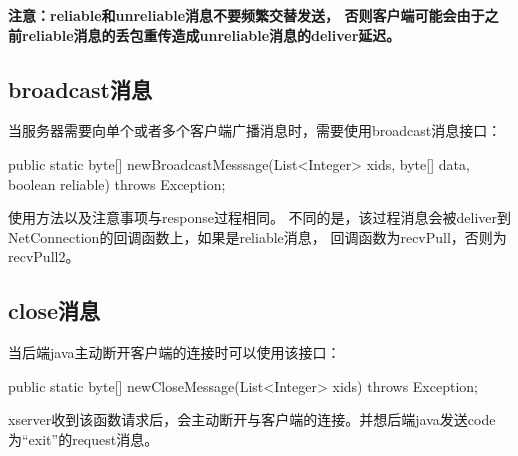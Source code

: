 {\bf{注意：reliable和unreliable消息不要频繁交替发送，
否则客户端可能会由于之前reliable消息的丢包重传造成unreliable消息的deliver延迟。}}

\subsection{broadcast消息}

当服务器需要向单个或者多个客户端广播消息时，需要使用broadcast消息接口：

\begin{javacode}
    public static byte[] newBroadcastMesssage(List<Integer> xids, byte[] data, boolean reliable) throws Exception;
\end{javacode}

使用方法以及注意事项与response过程相同。
不同的是，该过程消息会被deliver到NetConnection的回调函数上，如果是reliable消息，
回调函数为recvPull，否则为recvPull2。

\subsection{close消息}

当后端java主动断开客户端的连接时可以使用该接口：
\begin{javacode}
    public static byte[] newCloseMessage(List<Integer> xids) throws Exception;
\end{javacode}

xserver收到该函数请求后，会主动断开与客户端的连接。并想后端java发送code为``exit''的request消息。

